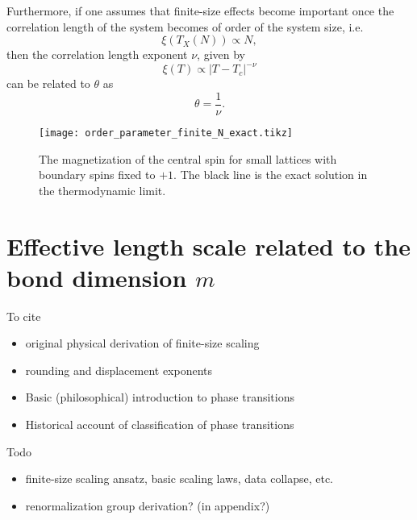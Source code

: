 Furthermore, if one assumes that finite-size effects become important once the correlation length of the system becomes of order of the system size, i.e. \cite{fisher1967interfacial}
\begin{equation}
  \xi(T_X(N)) \propto N,
\end{equation}
then the correlation length exponent $\nu$, given by
\begin{equation}
  \xi(T) \propto |T - T_c|^{-\nu}
\end{equation}
can be related to $\theta$ as
\begin{equation}
  \theta = \frac{1}{\nu}.
\end{equation}


\begin{figure}
  \texttt{[image: order\_parameter\_finite\_N\_exact.tikz]}
  \caption{The magnetization of the central spin for small lattices with boundary spins fixed to
  $+1$. The black line is the exact solution in the thermodynamic limit.}\label{fig:order_parameter_finite_N_exact}
\end{figure}




\section{Effective length scale related to the bond dimension $m$}

To cite

\begin{itemize}
  \item \cite{fisher1972scaling} original physical derivation of finite-size scaling
  \item \cite{fisher1967interfacial} rounding and displacement exponents
  \item \cite{kadanoff2009more} Basic (philosophical) introduction to phase transitions
  \item \cite{jaeger1998ehrenfest} Historical account of classification of phase transitions
\end{itemize}

Todo
\begin{itemize}
  \item finite-size scaling ansatz, basic scaling laws, data collapse, etc.
  \item renormalization group derivation? (in appendix?)
\end{itemize}
